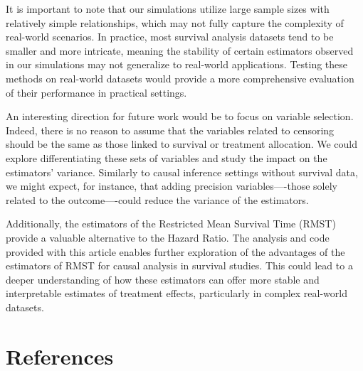 \documentclass[
  11pt,
  a4paper,
]{article}
\theoremstyle{plain}
\theoremstyle{plain}
\theoremstyle{plain}
\theoremstyle{definition}
\theoremstyle{remark}
\begin{document}
It is important to note that our simulations utilize large sample sizes
with relatively simple relationships, which may not fully capture the
complexity of real-world scenarios. In practice, most survival analysis
datasets tend to be smaller and more intricate, meaning the stability of
certain estimators observed in our simulations may not generalize to
real-world applications. Testing these methods on real-world datasets
would provide a more comprehensive evaluation of their performance in
practical settings.

An interesting direction for future work would be to focus on variable
selection. Indeed, there is no reason to assume that the variables
related to censoring should be the same as those linked to survival or
treatment allocation. We could explore differentiating these sets of
variables and study the impact on the estimators' variance. Similarly to
causal inference settings without survival data, we might expect, for
instance, that adding precision variables----those solely related to the
outcome----could reduce the variance of the estimators.

Additionally, the estimators of the Restricted Mean Survival Time (RMST)
provide a valuable alternative to the Hazard Ratio. The analysis and
code provided with this article enables further exploration of the
advantages of the estimators of RMST for causal analysis in survival
studies. This could lead to a deeper understanding of how these
estimators can offer more stable and interpretable estimates of
treatment effects, particularly in complex real-world datasets.

\section*{References}\label{references}
\end{document}
